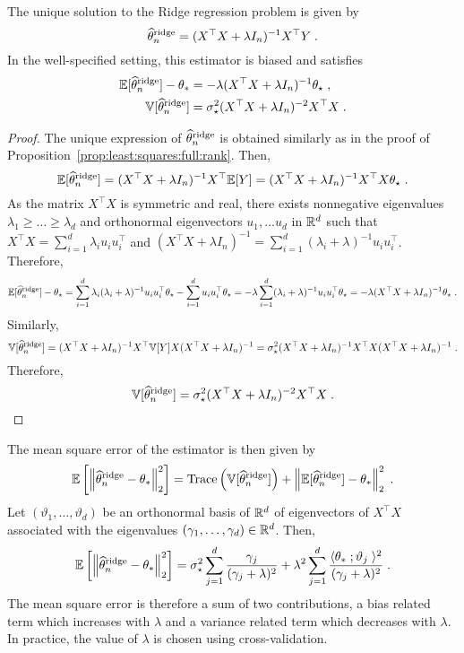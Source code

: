 \begin{shaded}
\begin{proposition}
\label{prop:least:squares:ridge}
The unique solution to the Ridge regression problem is given by
\[
\widehat {\theta}^{\mathrm{ridge}}_n = (X^\top X + \lambda I_n)^{-1}X^\top Y\;.
\] 
In the well-specified setting, this estimator is biased and satisfies 
\begin{align*}
\mathbb{E}[\widehat {\theta}^{\mathrm{ridge}}_n ] - \theta_*&= - \lambda(X^\top X + \lambda I_n)^{-1}\theta_\star\;,\\
\mathbb{V}[\widehat {\theta}^{\mathrm{ridge}}_n ] &= \sigma_\star^2(X^\top X + \lambda I_n)^{-2}X^\top X \;.
\end{align*}
\end{proposition}
\end{shaded}
\begin{proof}
The unique expression of $\widehat {\theta}^{\mathrm{ridge}}_n $ is obtained similarly as in the proof of Proposition~\ref{prop:least:squares:full:rank}. Then,
$$
\mathbb{E}[\widehat {\theta}^{\mathrm{ridge}}_n] =  (X^\top X + \lambda I_n)^{-1}X^\top \mathbb{E}[Y] =  (X^\top X + \lambda I_n)^{-1}X^\top X\theta_\star \;.
$$
As the matrix $X^\top X$ is symmetric and real, there exists nonnegative eigenvalues $\lambda_1\geqslant \ldots \geqslant \lambda_d$ and orthonormal eigenvectors $u_1, \ldots u_d$ in $\mathbb{R}^d$ such that $X^\top X = \sum_{i=1}^d \lambda_i u_i u_i^\top$ and $(X^\top X + \lambda I_n)^{-1} = \sum_{i=1}^d (\lambda_i + \lambda)^{-1}u_i u_i^\top$. Therefore, 
$$
\mathbb{E}[\widehat {\theta}^{\mathrm{ridge}}_n] -\theta_\star=  \sum_{i=1}^d \lambda_i(\lambda_i + \lambda)^{-1}u_i u_i^\top\theta_\star -  \sum_{i=1}^d u_i u_i^\top\theta_\star =  - \lambda  \sum_{i=1}^d (\lambda_i + \lambda)^{-1}u_i u_i^\top\theta_\star = - \lambda(X^\top X + \lambda I_n)^{-1}\theta_\star\;.
$$
Similarly,
$$
\mathbb{V}[\widehat {\theta}^{\mathrm{ridge}}_n]  =  (X^\top X + \lambda I_n)^{-1}X^\top \mathbb{V}[Y]X  (X^\top X + \lambda I_n)^{-1} = \sigma_\star^{2}(X^\top X + \lambda I_n)^{-1}X^\top X  (X^\top X + \lambda I_n)^{-1}\;.
$$
Therefore,
$$
\mathbb{V}[\widehat {\theta}^{\mathrm{ridge}}_n]  =   \sigma_\star^{2}(X^\top X + \lambda I_n)^{-2}X^\top X\;.
$$
\end{proof}
The mean square error of the estimator is then given by
\[
\mathbb{E}\left[\left\|\widehat {\theta}^{\mathrm{ridge}}_n-\theta_*\right\|_2^2\right] = \mathrm{Trace}\left(\mathbb{V}[\widehat {\theta}^{\mathrm{ridge}}_n]\right) + \left\|\mathbb{E}[\widehat {\theta}^{\mathrm{ridge}}_n] - \theta_*\right\|_2^2\;.
\]
Let $(\vartheta_1,\ldots,\vartheta_d)$ be an orthonormal basis of $\mathbb{R}^d$ of eigenvectors of $X^\top X$ associated with the eigenvalues $(\gamma_1,\ldots,\gamma_d)\in\mathbb{R}^d$. Then,
\[
\mathbb{E}\left[\left\|\widehat {\theta}^{\mathrm{ridge}}_n-\theta_*\right\|_2^2\right] =  \sigma_\star^2 \sum_{j=1}^d \frac{\gamma_j}{(\gamma_j+\lambda)^2} + \lambda^2  \sum_{j=1}^d \frac{\langle \theta_* \;; \vartheta_j\;\rangle^2}{(\gamma_j+\lambda)^2}\;.
\]
The mean square error is therefore a sum of two contributions, a bias related term which increases with $\lambda$ and a variance related term which decreases with $\lambda$. In practice, the value of $\lambda$ is chosen using cross-validation.

